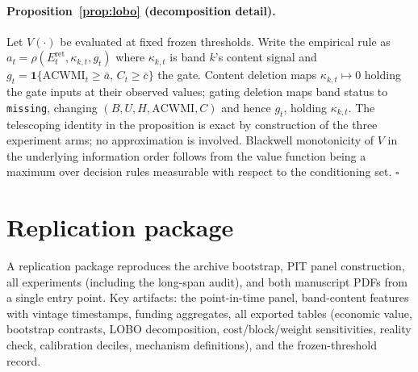 \documentclass[12pt]{article}
\begin{document}
\paragraph{Proposition~\ref{prop:lobo} (decomposition detail).}
Let $V(\cdot)$ be evaluated at fixed frozen thresholds. Write the empirical rule as $a_t=\rho(E^{\mathrm{ret}}_t,\kappa_{k,t},g_t)$ where $\kappa_{k,t}$ is band $k$'s content signal and $g_t=\mathbf{1}\{\mathrm{ACWMI}_t\ge\bar a,\,C_t\ge\bar c\}$ the gate. Content deletion maps $\kappa_{k,t}\mapsto 0$ holding the gate inputs at their observed values; gating deletion maps band status to \texttt{missing}, changing $(B,U,H,\mathrm{ACWMI},C)$ and hence $g_t$, holding $\kappa_{k,t}$. The telescoping identity in the proposition is exact by construction of the three experiment arms; no approximation is involved. Blackwell monotonicity of $V$ in the underlying information order follows from the value function being a maximum over decision rules measurable with respect to the conditioning set. \hfill$\square$

\section{Replication package}
\label{app:repro}
A replication package reproduces the archive bootstrap, PIT panel construction, all experiments (including the long-span audit), and both manuscript PDFs from a single entry point. Key artifacts: the point-in-time panel, band-content features with vintage timestamps, funding aggregates, all exported tables (economic value, bootstrap contrasts, LOBO decomposition, cost/block/weight sensitivities, reality check, calibration deciles, mechanism definitions), and the frozen-threshold record.
\end{document}

